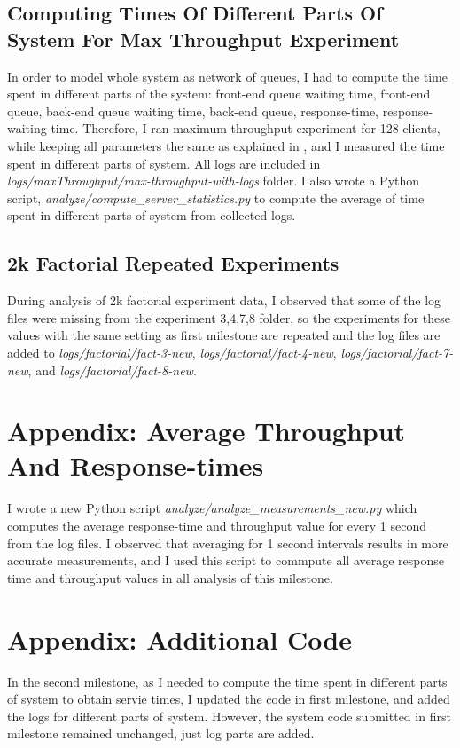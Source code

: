 \documentclass[11pt]{article}
\begin{document}
\begin{appendices}
\subsection{Computing Times Of Different Parts Of System For Max Throughput Experiment}
\label{sec:max-throughput}
In order to model whole system as network of queues, I had to compute the time spent in different 
parts of the system: front-end queue waiting time, front-end queue, back-end queue waiting time, 
back-end queue, response-time, response-waiting time. Therefore, I ran maximum throughput experiment for 
128 clients, while keeping all parameters the same as explained in \cite[section~3.3]{ms1},
and I measured the time spent in different parts of system. All logs are 
included in \emph{logs/maxThroughput/max-throughput-with-logs} folder. I also wrote a Python script, 
\emph{analyze/compute\_server\_statistics.py} to compute the average of time spent in different parts of system 
from collected logs.

\subsection{2k Factorial Repeated Experiments}
\label{sec:2k}
During analysis of 2k factorial experiment data, I observed that some of the log files were missing from the 
experiment 3,4,7,8  folder, so the experiments for these values with the same setting as first milestone 
are repeated and the log files are added to \emph{logs/factorial/fact-3-new}, \emph{logs/factorial/fact-4-new}, 
\emph{logs/factorial/fact-7-new}, and \emph{logs/factorial/fact-8-new}.

\section{Appendix: Average Throughput And Response-times}
I wrote a new Python script \emph{analyze/analyze\_measurements\_new.py} which computes the average
response-time and throughput value for every 1 second from the log files. I observed that averaging for 1 second intervals results in 
more accurate measurements, and I used this script to commpute all average response time and throughput values in all analysis of this 
milestone. 

\section{Appendix: Additional Code}
In the second milestone, as I needed to compute the time spent in different parts of system to obtain 
servie times, I updated the code in first milestone, and added the logs for different parts of system.
However, the system code submitted in first milestone remained unchanged, just log parts are added. 

\end{appendices}



\end{document}

